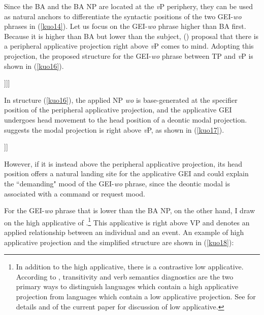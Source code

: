 \documentclass[output=paper,colorlinks,citecolor=brown]{langscibook}
\begin{document}
Since the BA and the BA NP are located at the \textit{v}P periphery, they can be used as natural anchors to differentiate the syntactic positions of the two GEI-\textit{wo} phrases in (\ref{kuo14}). Let us focus on the GEI-\textit{wo} phrase higher than BA first. Because it is higher than BA but lower than the subject,  (\citeyear{kim2011, kim2012}) proposal that there is a peripheral applicative projection right above \textit{v}P comes to mind. Adopting this projection, the proposed structure for the GEI-\textit{wo} phrase between TP and \textit{v}P is shown in (\ref{kuo16}).

\ea
\label{kuo16}
\glt [\textsubscript{TP} Ni\textsubscript{i}  [\textsubscript{MPDEO}  gei\textsubscript{j}  [\textsubscript{peripheral ApplP}  wo  t\textsubscript{j}  [\textsubscript{\textit{v}P}  t\textsubscript{i}  ......]]]]\\  
\z

In structure (\ref{kuo16}), the applied NP \textit{wo} is base-generated at the specifier position of the peripheral applicative projection, and the applicative GEI undergoes head movement to the head position of a deontic modal projection. \citet{Tsai2015a} suggests the modal projection is right above \textit{v}P, as shown in (\ref{kuo17}).

\ea
\label{kuo17}
\glt [\textsubscript{TP} Subject\textsubscript{i}..... [\textsubscript{MP\textsubscript{DEO}}   Deontic modal  [\textsubscript{\textit{v}P}  t\textsubscript{i}  ......]]]\\  
\z

However, if it is instead above the peripheral applicative projection, its head position offers a natural landing site for the applicative GEI and could explain the ``demanding" mood of the GEI-\textit{wo} phrase, since the deontic modal is associated with a command or request mood.

For the GEI-\textit{wo} phrase that is lower than the BA NP, on the other hand, I draw on the high applicative of \citet{Pylkkanen2002, Pylkkanen2008}.\footnote{In addition to the high applicative, there is a contrastive low applicative. According to \citet{Pylkkanen2002}, transitivity and verb semantics diagnostics are the two primary ways to distinguish languages which contain a high applicative projection from languages which contain a low applicative projection. See \citet{Pylkkanen2002, Pylkkanen2008} for details and  of the current paper for discussion of  low applicative.} This applicative is right above VP and denotes an applied relationship between an individual and an event. An example of  high applicative projection and the simplified structure are shown in (\ref{kuo18}):
\end{document}
